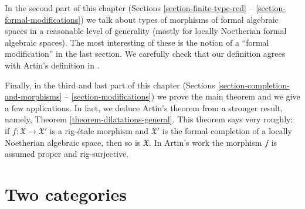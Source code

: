 \medskip\noindent
In the second part of this chapter
(Sections \ref{section-finite-type-red} -- \ref{section-formal-modifications})
we talk about types of morphisms of formal algebraic spaces
in a reasonable level of generality (mostly for locally Noetherian
formal algebraic spaces). The most interesting of these is
the notion of a ``formal modification'' in the last section.
We carefully check that our definition agrees with
Artin's definition in \cite{ArtinII}.

\medskip\noindent
Finally, in the third and last part of this chapter
(Sections \ref{section-completion-and-morphisms} --
\ref{section-modifications}) we prove the main theorem and
we give a few applications.
In fact, we deduce Artin's theorem from a stronger
result, namely, Theorem \ref{theorem-dilatations-general}.
This theorem says very roughly: if $f : \mathfrak X \to \mathfrak X'$
is a rig-\'etale morphism and $\mathfrak X'$ is the formal
completion of a locally Noetherian algebraic space, then so
is $\mathfrak X$. In Artin's work the morphism $f$ is assumed proper
and rig-surjective.









\section{Two categories}
\label{section-two-categories}


